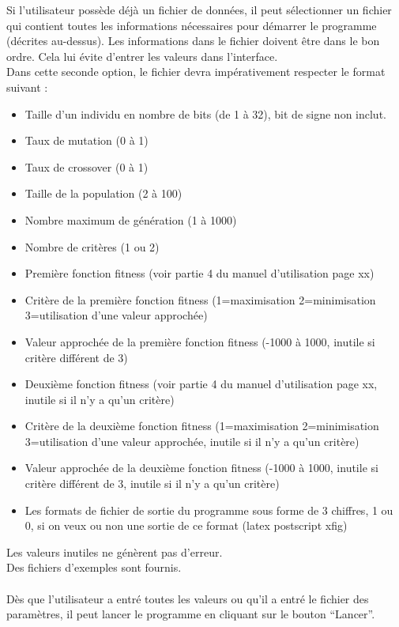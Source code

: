 \documentclass[a4paper,11pt]{article}
\begin{document}
			Si l’utilisateur possède déjà un fichier de données, il peut  sélectionner un fichier qui contient toutes les informations nécessaires pour démarrer le programme (décrites au-dessus).
			Les informations dans le fichier doivent être dans le bon ordre.
			Cela lui évite d’entrer les valeurs dans l’interface.\\
			Dans cette seconde option, le fichier devra impérativement respecter le format suivant :
				\begin{itemize}
					\item Taille d'un individu en nombre de bits (de 1 à 32), bit de signe non inclut.
					\item Taux de mutation (0 à 1)
					\item Taux de crossover (0 à 1)
					\item Taille de la population (2 à 100)
					\item Nombre maximum de génération (1 à 1000)
					\item Nombre de critères (1 ou 2)
					\item Première fonction fitness (voir partie 4 du manuel d'utilisation page xx)
					\item Critère de la première fonction fitness (1=maximisation 2=minimisation 3=utilisation d'une valeur approchée)
					\item Valeur approchée de la première fonction fitness (-1000 à 1000, inutile si critère différent de 3)
					\item Deuxième fonction fitness (voir partie 4 du manuel d'utilisation page xx, inutile si il n'y a qu'un critère)
					\item Critère de la deuxième fonction fitness (1=maximisation 2=minimisation 3=utilisation d'une valeur approchée, inutile si il n'y a qu'un critère)
					\item Valeur approchée de la deuxième fonction fitness (-1000 à 1000, inutile si critère différent de 3, inutile si il n'y a qu'un critère)
					\item Les formats de fichier de sortie du programme sous forme de 3 chiffres, 1 ou 0, si on veux ou non une sortie de ce format (latex postscript xfig)
				\end{itemize}
			Les valeurs inutiles ne génèrent pas d'erreur.\\
			Des fichiers d'exemples sont fournis.\\\\
			Dès que l’utilisateur a entré toutes les valeurs ou qu’il a entré le fichier des paramètres, il peut lancer le programme en cliquant sur le bouton “Lancer”.\\
\end{document}
